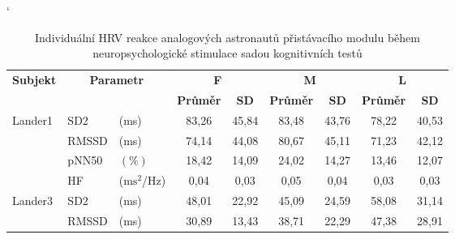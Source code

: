 \begin{table}[h]
    \catcode`
    \footnotesize
    \centering
    \caption{Individuální HRV reakce analogových astronautů přistávacího modulu během neuropsychologické stimulace sadou kognitivních testů}
    \begin{threeparttable}
        \begin{tabular*}{\linewidth}{@{\extracolsep{\fill}} lllcccccc @{}}
            \toprule
            \textbf{Subjekt}            & \multicolumn{2}{c}{\textbf{Parametr}} & \multicolumn{2}{c}{\textbf{F}} & \multicolumn{2}{c}{\textbf{M}} & \multicolumn{2}{c}{\textbf{L}}                                                                 \\ \cmidrule(rl){4-5} \cmidrule(rl){6-7} \cmidrule(rl){8-9}
            &                                       &                                & \textbf{Průměr}                & \textbf{SD}                    & \textbf{Průměr} & \textbf{SD} & \textbf{Průměr} & \textbf{SD} \\ \midrule
            \multirow[t]{4}{*}{Lander1} & SD2                                  & (ms)                           & 83,26                          & 45,84                          & 83,48           & 43,76       & 78,22           & 40,53       \\
            & RMSSD                                 & (ms)                           & 74,14                          & 44,08                          & 80,67           & 45,11       & 71,23           & 42,12       \\
            & pNN50                                 & $(\%)$                         & 18,42                          & 14,09                          & 24,02           & 14,27       & 13,46           & 12,07       \\
            & HF                                    & ($\text{ms}^2$/Hz)             & 0,04                           & 0,03                           & 0,05            & 0,04        & 0,03            & 0,03        \\ \midrule
            \multirow[t]{4}{*}{Lander3} & SD2                                  & (ms)                           & 48,01                          & 22,92                          & 45,09           & 24,59       & 58,08           & 31,14       \\
            & RMSSD                                 & (ms)                           & 30,89                          & 13,43                          & 38,71           & 22,29       & 47,38           & 28,91        \\

\end{tabular*}
\end{threeparttable}
\end{table}
